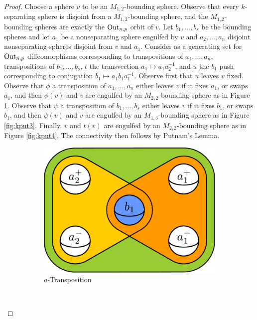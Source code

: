 \begin{proof}
Choose a sphere $v$ to be an $M_{1,2}$-bounding sphere.
Observe that every $k$-separating sphere is disjoint from a
$M_{1,2}$-bounding sphere, and the $M_{1,2}$-bounding spheres
are exactly the $\operatorname{Out}_{n,p}$ orbit of $v$.
Let $b_1,\ldots,b_s$ be the bounding spheres
and let $a_1$ be a nonseparating sphere engulfed by $v$ and $a_2, \ldots, a_n$
disjoint nonseparating spheres disjoint from $v$ and $a_1$.
Consider as a generating set for $\operatorname{Out}_{n,p}$
diffeomorphisms corresponding to
transpositions of $a_1,\ldots,a_n$,
transpositions of $b_1,\ldots,b_s$,
$t$ the transvection $a_1 \mapsto a_1a_2^{-1}$,
and $u$ the $b_1$ push corresponding to
conjugation $b_1 \mapsto a_1b_1a_1^{-1}$.
Observe first that $u$ leaves $v$ fixed.
Observe  that $\phi$ a
transposition of  $a_1,\ldots,a_n$
either leaves $v$ if it fixes $a_1$, or
swaps $a_1$, and then $\phi(v)$ and $v$
are engulfed by an $M_{2,2}$-bounding sphere as in Figure \ref{fig:kput2}.
Observe that $\psi$ a
transposition of  $b_1,\ldots,b_s$
either leaves $v$ if it fixes $b_1$, or
swaps $b_1$, and then $\psi(v)$ and $v$
are engulfed by an $M_{1,3}$-bounding sphere as in Figure \ref{fig:kput3}.
Finally,
$v$ and $t(v)$
are engulfed by an $M_{2,2}$-bounding sphere as in Figure \ref{fig:kput4}.
The connectivity then follows by Putnam's Lemma.
\begin{figure}[b!]
    \centering
    \begin{subfigure}[b]{0.3\textwidth}
        \includegraphics[width=\textwidth]{figures/kput2.pdf}
        \caption{$a$-Transposition}
        \label{fig:kput2}
    \end{subfigure}
    ~
    \begin{subfigure}[b]{0.3\textwidth}

\end{subfigure}
\end{figure}
\end{proof}
